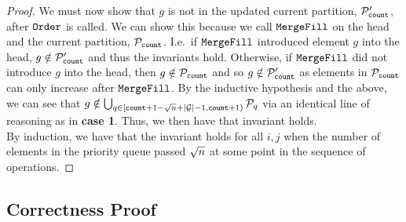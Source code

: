 \begin{proof}
We must now show that $g$ is not in the updated current partition, $\mathcal{P}'_{\texttt{count}}$, after $\texttt{Order}$ is called.
We can show this because we call $\texttt{MergeFill}$ on the head and the current partition, $\mathcal{P}_{\texttt{count}}$. I.e.\ if $\texttt{MergeFill}$ introduced element $g$
into the head, $g \notin \mathcal{P}'_{\texttt{count}}$ and thus the invariants hold. Otherwise, if $\texttt{MergeFill}$ did not introduce $g$ into the head, then $g \notin \mathcal{P}_{\texttt{count}}$ and so $g \notin \mathcal{P}'_{\texttt{count}}$
as elements in $\mathcal{P}_{\texttt{count}}$ can only increase after $\texttt{MergeFill}$.
By the inductive hypothesis and the above, we can see that $g \notin \bigcup_{q \in [{\texttt{count}} + 1 - {\sqrt{n}} + |\mathcal{G}| - 1, {\texttt{count}} + 1)} \mathcal{P}_q$ via an identical line of reasoning as in \textbf{case 1}.
Thus, we then have that invariant holds.\\


By induction, we have that the invariant holds for all $i, j$ when the number of elements in the priority queue passed ${\sqrt{n}}$ at some point in the sequence of operations.
\end{proof}

\subsection{Correctness Proof}
